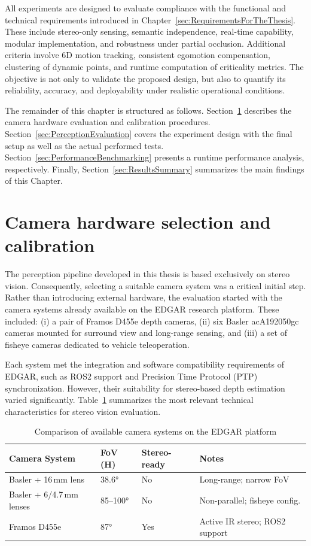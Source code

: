 All experiments are designed to evaluate compliance with the functional and 
technical requirements introduced in 
Chapter~\ref{sec:RequirementsForTheThesis}. These include stereo-only sensing, 
semantic independence, real-time capability, modular implementation, and 
robustness under partial occlusion. Additional criteria involve 6D motion 
tracking, consistent egomotion compensation, clustering of dynamic points, and 
runtime computation of criticality metrics. The objective is not only to validate 
the proposed design, but also to quantify its reliability, accuracy, and 
deployability under realistic operational conditions.

The remainder of this chapter is structured as follows. Section~\ref{sec:CameraHardware} 
describes the camera hardware evaluation and calibration procedures. Section~\ref{sec:PerceptionEvaluation} covers the experiment 
design with the final setup as well as the actual performed tests. Section~\ref{sec:PerformanceBenchmarking} presents a runtime performance analysis, respectively. Finally, 
Section~\ref{sec:ResultsSummary} summarizes the main findings of this Chapter.

\section{Camera hardware selection and calibration}\label{sec:CameraHardware}

The perception pipeline developed in this thesis is based exclusively on 
stereo vision. Consequently, selecting a suitable camera system was a 
critical initial step. Rather than introducing external hardware, the 
evaluation started with the camera systems already available on the 
EDGAR research platform. These included: (i) a pair of Framos D455e 
depth cameras, (ii) six Basler acA1920\-50gc cameras mounted for 
surround view and long-range sensing, and (iii) a set of fisheye cameras 
dedicated to vehicle teleoperation.

Each system met the integration and software compatibility requirements 
of EDGAR, such as ROS2 support and Precision Time Protocol (PTP) 
synchronization. However, their suitability for stereo-based depth 
estimation varied significantly. Table~\ref{tab:camera_specs} summarizes 
the most relevant technical characteristics for stereo vision evaluation.

\begin{table}[H]
  \centering
  \caption{Comparison of available camera systems on the EDGAR platform}
  \label{tab:camera_specs}
  \begin{tabular}{p{2.7cm} p{1.4cm} p{1.1cm} p{2.8cm}}
    \toprule
    \textbf{Camera System} & \textbf{FoV (H)} & \textbf{Stereo-ready} & 
    \textbf{Notes} \\
    \midrule
    Basler + 16\,mm lens & 38.6° & No & Long-range; narrow FoV \\
    Basler + 6/4.7\,mm lenses & 85–100° & No & Non-parallel; fisheye config. \\
    Framos D455e & 87° & Yes & Active IR stereo; ROS2 support \\
    \bottomrule
  \end{tabular}
\end{table}

